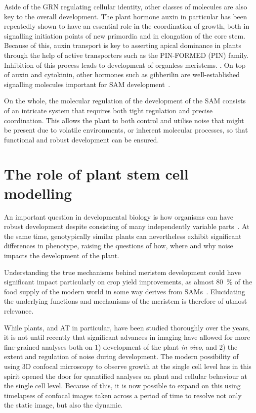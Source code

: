 Aside of the GRN regulating cellular identity, other classes of
molecules  are also key to the overall development.  
The plant hormone auxin in particular has been repeatedly shown to have an
essential role in the coordination of growth, both in 
signalling initiation points of new primordia and in elongation of the core stem.
Because of this, auxin transport is key to asserting apical dominance in plants
through the help of active transporters such as the PIN-FORMED (PIN) family. Inhibition of this process leads to development of organless meristems.
\cite{kvrevcek2009pin}. On top of auxin and cytokinin, other hormones such as gibberilin are well-established
signalling molecules important for SAM
development~\cite{debeaujon2000gibberellin}.

On the whole, the molecular regulation of the
development of the SAM consists of an intricate system that requires both tight
regulation and precise coordination. This allows the plant to both control and 
utilise noise that might be present due to volatile environments, or inherent
molecular processes, so that functional and robust development can be ensured.

\section{The role of plant stem cell modelling}
An important question in developmental biology is how organisms can have robust
development despite consisting of many independently variable
parts~\cite{mirabet2012noise,ciliberti2007robustness,lempe2013molecular}.
At the same time, genotypically similar plants can nevertheless exhibit
significant differences in phenotype, raising the questions of how, where and
why noise impacts the development of the plant. 

Understanding the true mechanisms behind meristem development could have
significant impact particularly on crop yield improvements, as almost 80~\% of
the food supply
of the modern world in some way derives from SAMs~\cite{eightyperc}. Elucidating
the underlying functions and mechanisms of the  
meristem is therefore of utmost relevance.

While plants, and AT in particular, have been studied thoroughly over the years,
it is not until recently that significant advances in imaging have allowed for
more fine-grained analyses both on 1) development of the plant \textit{in vivo},
and 2) the extent and regulation of noise during development. The modern
possibility of using 3D confocal microscopy to observe growth at the
single cell level has in this spirit opened the door for quantified analyses on
plant and cellular behaviour at the single cell level. Because of this, it is now
possible to expand on this using timelapses of confocal images taken across a
period of time to resolve not only the static image, but also the dynamic. 

